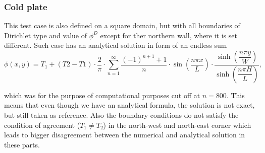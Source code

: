 \documentclass[]{article}
\begin{document}
\subsubsection{Cold plate}
This test case is also defined on a square domain, but with all boundaries of Dirichlet type and value of $ \phi^D $ except for ther northern wall, where it is set different. Such case has an analytical solution in form of an endless sum
\begin{equation}
\phi(x,y) = T_1 + (T2-T1) \cdot \dfrac{2}{\pi} \cdot \sum_{n=1}^{\infty} \dfrac{(-1)^{n+1}+1}{n} \cdot \sin\left(\dfrac{n\pi x}{L}\right) \cdot \dfrac{\sinh\left(\dfrac{n\pi y}{W}\right)}{\sinh\left(\dfrac{n\pi H}{L}\right)},
\end{equation}

which was for the purpose of computational purposes cut off at $ n=800 $. This means that even though we have an analytical formula, the solution is not exact, but still taken as reference. Also the boundary conditions do not satisfy the condition of agreement ($ T_1 \neq T_2 $) in the north-west and north-east corner which leads to bigger disagreement between the numerical and analytical solution in these parts.
\end{document}
